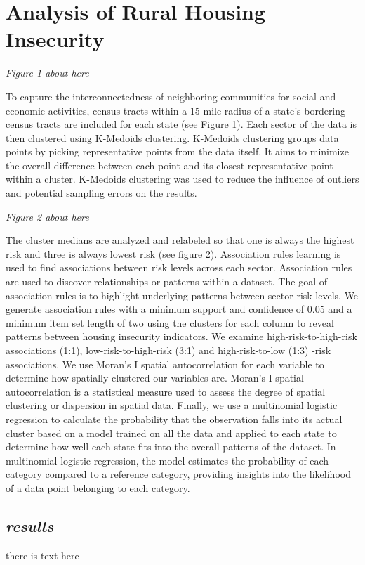 \chapter{Analysis of Rural Housing Insecurity}	

\textit{Figure 1 about here}

To capture the interconnectedness of neighboring communities for social and economic activities, census tracts within a 15-mile radius of a state’s bordering census tracts are included for each state (see Figure 1). Each sector of the data is then clustered using K-Medoids clustering. K-Medoids clustering groups data points by picking representative points from the data itself. It aims to minimize the overall difference between each point and its closest representative point within a cluster.  K-Medoids clustering was used to reduce the influence of outliers and potential sampling errors on the results.  


\textit{Figure 2 about here}

The cluster medians are analyzed and relabeled so that one is always the highest risk and three is always lowest risk (see figure 2). Association rules learning is used to find associations between risk levels across each sector. Association rules are used to discover relationships or patterns within a dataset. The goal of association rules is to highlight underlying patterns between sector risk levels. We generate association rules with a minimum support and confidence of 0.05 and a minimum item set length of two using the clusters for each column to reveal patterns between housing insecurity indicators. We examine high-risk-to-high-risk associations (1:1), low-risk-to-high-risk (3:1) and high-risk-to-low (1:3) -risk associations. We use Moran’s I spatial autocorrelation for each variable to determine how spatially clustered our variables are. Moran's I spatial autocorrelation is a statistical measure used to assess the degree of spatial clustering or dispersion in spatial data. Finally, we use a multinomial logistic regression to calculate the probability that the observation falls into its actual cluster based on a model trained on all the data and applied to each state to determine how well each state fits into the overall patterns of the dataset. In multinomial logistic regression, the model estimates the probability of each category compared to a reference category, providing insights into the likelihood of a data point belonging to each category. 

\section{\textit{results}}
there is text here 

